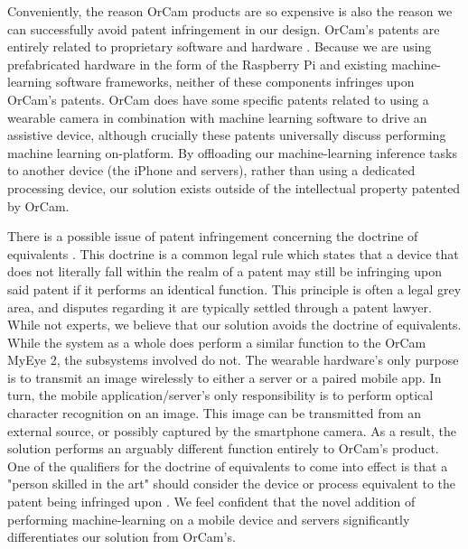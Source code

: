 \documentclass[a4paper,11pt]{article}
\begin{document}
Conveniently, the reason OrCam products are so expensive is also the reason we can successfully avoid patent infringement in our design. OrCam's patents are entirely related to proprietary software \cite{orcam-software} and hardware \cite{orcam-hardware}. Because we are using prefabricated hardware in the form of the Raspberry Pi and existing machine-learning software frameworks, neither of these components infringes upon OrCam's patents. OrCam does have some specific patents related to using a wearable camera in combination with machine learning software to drive an assistive device, although crucially these patents universally discuss performing machine learning on-platform. By offloading our machine-learning inference tasks to another device (the iPhone and servers), rather than using a dedicated processing device, our solution exists outside of the intellectual property patented by OrCam.

There is a possible issue of patent infringement concerning the doctrine of equivalents \cite{doctrine-of-equivalents}. This doctrine is a common legal rule which states that a device that does not literally fall within the realm of a patent may still be infringing upon said patent if it performs an identical function. This principle is often a legal grey area, and disputes regarding it are typically settled through a patent lawyer. While not experts, we believe that our solution avoids the doctrine of equivalents. While the system as a whole does perform a similar function to the OrCam MyEye 2, the subsystems involved do not. The wearable hardware's only purpose is to transmit an image wirelessly to either a server or a paired mobile app. In turn, the mobile application/server's only responsibility is to perform optical character recognition on an image. This image can be transmitted from an external source, or possibly captured by the smartphone camera. As a result, the solution performs an arguably different function entirely to OrCam's product. One of the qualifiers for the doctrine of equivalents to come into effect is that a "person skilled in the art" should consider the device or process equivalent to the patent being infringed upon \cite{doctrine-of-equivalents}. We feel confident that the novel addition of performing machine-learning on a mobile device and servers significantly differentiates our solution from OrCam's.
\end{document}
